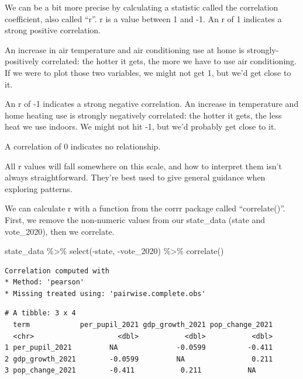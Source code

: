 \documentclass[
  letterpaper,
  DIV=11,
  numbers=noendperiod]{scrreprt}
\newenvironment{Shaded}{\begin{snugshade}}{\end{snugshade}}
\newcommand{\FunctionTok}[1]{\textcolor[rgb]{0.28,0.35,0.67}{#1}}
\newcommand{\NormalTok}[1]{\textcolor[rgb]{0.00,0.23,0.31}{#1}}
\newcommand{\SpecialCharTok}[1]{\textcolor[rgb]{0.37,0.37,0.37}{#1}}
\begin{document}
We can be a bit more precise by calculating a statistic called the
correlation coefficient, also called ``r''. r is a value between 1 and
-1. An r of 1 indicates a strong positive correlation.

An increase in air temperature and air conditioning use at home is
strongly-positively correlated: the hotter it gets, the more we have to
use air conditioning. If we were to plot those two variables, we might
not get 1, but we'd get close to it.

An r of -1 indicates a strong negative correlation. An increase in
temperature and home heating use is strongly negatively correlated: the
hotter it gets, the less heat we use indoors. We might not hit -1, but
we'd probably get close to it.

A correlation of 0 indicates no relationship.

All r values will fall somewhere on this scale, and how to interpret
them isn't always straightforward. They're best used to give general
guidance when exploring patterns.

We can calculate r with a function from the corrr package called
``correlate()''. First, we remove the non-numeric values from our
state\_data (state and vote\_2020), then we correlate.

\begin{Shaded}
\begin{Highlighting}[]
\NormalTok{state\_data }\SpecialCharTok{\%\textgreater{}\%}
  \FunctionTok{select}\NormalTok{(}\SpecialCharTok{{-}}\NormalTok{state, }\SpecialCharTok{{-}}\NormalTok{vote\_2020) }\SpecialCharTok{\%\textgreater{}\%}
  \FunctionTok{correlate}\NormalTok{()}
\end{Highlighting}
\end{Shaded}

\begin{verbatim}
Correlation computed with
* Method: 'pearson'
* Missing treated using: 'pairwise.complete.obs'
\end{verbatim}

\begin{verbatim}
# A tibble: 3 x 4
  term            per_pupil_2021 gdp_growth_2021 pop_change_2021
  <chr>                    <dbl>           <dbl>           <dbl>
1 per_pupil_2021         NA              -0.0599          -0.411
2 gdp_growth_2021        -0.0599         NA                0.211
3 pop_change_2021        -0.411           0.211           NA    
\end{verbatim}
\end{document}
